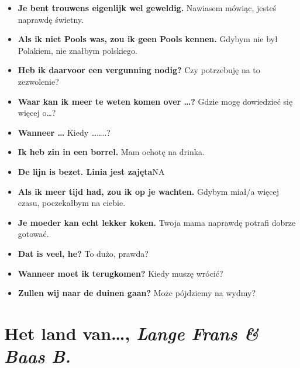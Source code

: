 \documentclass[
]{book}
\providecommand{\tightlist}{%
  \setlength{\itemsep}{0pt}\setlength{\parskip}{0pt}}
\begin{document}
\begin{itemize}
\tightlist
\item
  \textbf{Je bent trouwens eigenlijk wel geweldig.} Nawiasem mówiąc, jesteś naprawdę świetny.\\
\item
  \textbf{Als ik niet Pools was, zou ik geen Pools kennen.} Gdybym nie był Polakiem, nie znałbym polskiego.\\
\item
  \textbf{Heb ik daarvoor een vergunning nodig?} Czy potrzebuję na to zezwolenie?\\
\item
  \textbf{Waar kan ik meer te weten komen over \ldots?} Gdzie mogę dowiedzieć się więcej o\ldots?\\
\item
  \textbf{Wanneer \ldots{}} Kiedy \ldots\ldots..?\\
\item
  \textbf{Ik heb zin in een borrel.} Mam ochotę na drinka.\\
\item
  \textbf{De lijn is bezet. Linia jest zajęta}NA\\
\item
  \textbf{Als ik meer tijd had, zou ik op je wachten.} Gdybym miał/a więcej czasu, poczekałbym na ciebie.\\
\item
  \textbf{Je moeder kan echt lekker koken.} Twoja mama naprawdę potrafi dobrze gotować.\\
\item
  \textbf{Dat is veel, he?} To dużo, prawda?\\
\item
  \textbf{Wanneer moet ik terugkomen?} Kiedy muszę wrócić?\\
\item
  \textbf{Zullen wij naar de duinen gaan?} Może pójdziemy na wydmy?
\end{itemize}

\hypertarget{Het-land-van}{%
\section{\texorpdfstring{Het land van\ldots, \emph{Lange Frans \& Baas B.}}{Het land van\ldots, Lange Frans \& Baas B.}}\label{Het-land-van}}
\end{document}
